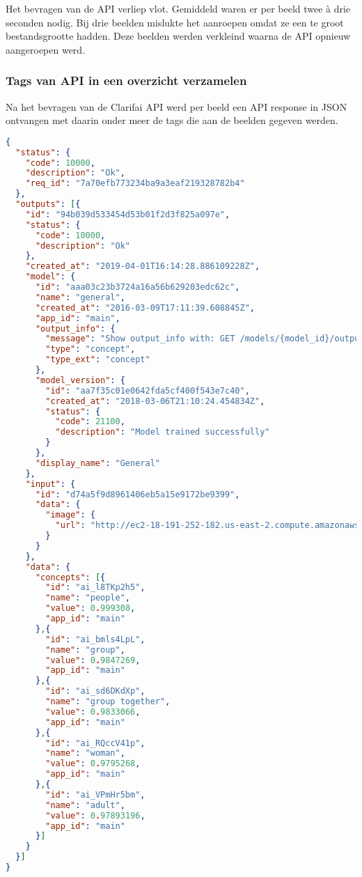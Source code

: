 Het bevragen van de API verliep vlot. Gemiddeld waren er per beeld twee à drie seconden nodig. Bij drie beelden mislukte het aanroepen omdat ze een te groot bestandsgrootte hadden. Deze beelden werden verkleind waarna de API opnieuw aangeroepen werd.

\subsubsection{Tags van API in een overzicht verzamelen}
\label{subsubsec:tags-verzamelen-overzicht}

Na het bevragen van de Clarifai API werd per beeld een API response in JSON ontvangen met daarin onder meer de tags die aan de beelden gegeven werden.

\begin{lstlisting}[language=json,caption=een ingekorte versie van een ontvangen API response met voorspellingen van Clarifai .]
{
  "status": {
    "code": 10000,
    "description": "Ok",
    "req_id": "7a70efb773234ba9a3eaf219328782b4"
  },
  "outputs": [{
    "id": "94b039d533454d53b01f2d3f825a097e",
    "status": {
      "code": 10000,
      "description": "Ok"
    },
    "created_at": "2019-04-01T16:14:28.886109228Z",
    "model": {
      "id": "aaa03c23b3724a16a56b629203edc62c",
      "name": "general",
      "created_at": "2016-03-09T17:11:39.608845Z",
      "app_id": "main",
      "output_info": {
        "message": "Show output_info with: GET /models/{model_id}/output_info",
        "type": "concept",
        "type_ext": "concept"
      },
      "model_version": {
        "id": "aa7f35c01e0642fda5cf400f543e7c40",
        "created_at": "2018-03-06T21:10:24.454834Z",
        "status": {
       	  "code": 21100,
          "description": "Model trained successfully"
        }
      },
      "display_name": "General"
   	},
    "input": {
      "id": "d74a5f9d8961406eb5a15e9172be9399",
      "data": {
        "image": {
          "url": "http://ec2-18-191-252-182.us-east-2.compute.amazonaws.com:8182/iiif/2/FO-30-00197/full/full/0/default.jpg"
        }
      }
    },
    "data": {
      "concepts": [{
        "id": "ai_l8TKp2h5",
        "name": "people",
        "value": 0.999308,
        "app_id": "main"
      },{
        "id": "ai_bmls4LpL",
        "name": "group",
        "value": 0.9847269,
        "app_id": "main"
      },{
        "id": "ai_sd6DKdXp",
        "name": "group together",
        "value": 0.9833066,
        "app_id": "main"
      },{
        "id": "ai_RQccV41p",
        "name": "woman",
        "value": 0.9795268,
        "app_id": "main"
      },{
        "id": "ai_VPmHr5bm",
        "name": "adult",
        "value": 0.97893196,
        "app_id": "main"
      }]
    }
  }]
}
\end{lstlisting}

